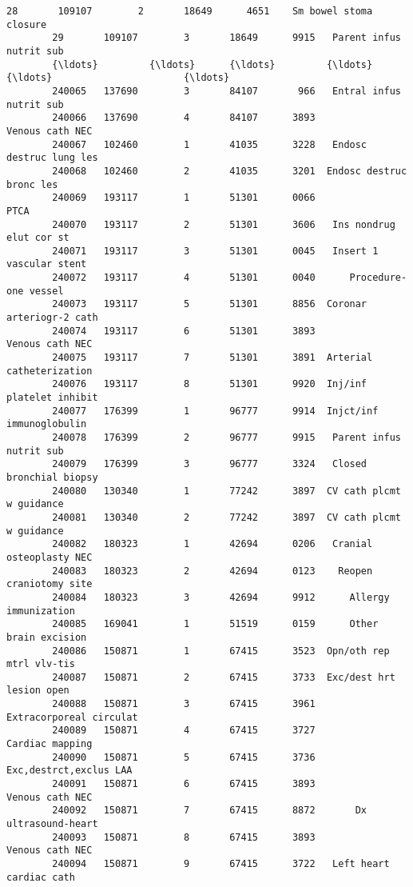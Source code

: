 \documentclass[11pt]{article}
\begin{document}
\begin{Verbatim}[commandchars=\\\{\}]
        28       109107        2       18649      4651    Sm bowel stoma closure   
        29       109107        3       18649      9915   Parent infus nutrit sub   
        {\ldots}         {\ldots}      {\ldots}         {\ldots}       {\ldots}                       {\ldots}   
        240065   137690        3       84107       966   Entral infus nutrit sub   
        240066   137690        4       84107      3893           Venous cath NEC   
        240067   102460        1       41035      3228   Endosc destruc lung les   
        240068   102460        2       41035      3201  Endosc destruc bronc les   
        240069   193117        1       51301      0066                      PTCA   
        240070   193117        2       51301      3606   Ins nondrug elut cor st   
        240071   193117        3       51301      0045   Insert 1 vascular stent   
        240072   193117        4       51301      0040      Procedure-one vessel   
        240073   193117        5       51301      8856  Coronar arteriogr-2 cath   
        240074   193117        6       51301      3893           Venous cath NEC   
        240075   193117        7       51301      3891  Arterial catheterization   
        240076   193117        8       51301      9920  Inj/inf platelet inhibit   
        240077   176399        1       96777      9914  Injct/inf immunoglobulin   
        240078   176399        2       96777      9915   Parent infus nutrit sub   
        240079   176399        3       96777      3324   Closed bronchial biopsy   
        240080   130340        1       77242      3897  CV cath plcmt w guidance   
        240081   130340        2       77242      3897  CV cath plcmt w guidance   
        240082   180323        1       42694      0206   Cranial osteoplasty NEC   
        240083   180323        2       42694      0123    Reopen craniotomy site   
        240084   180323        3       42694      9912      Allergy immunization   
        240085   169041        1       51519      0159      Other brain excision   
        240086   150871        1       67415      3523  Opn/oth rep mtrl vlv-tis   
        240087   150871        2       67415      3733  Exc/dest hrt lesion open   
        240088   150871        3       67415      3961   Extracorporeal circulat   
        240089   150871        4       67415      3727           Cardiac mapping   
        240090   150871        5       67415      3736    Exc,destrct,exclus LAA   
        240091   150871        6       67415      3893           Venous cath NEC   
        240092   150871        7       67415      8872       Dx ultrasound-heart   
        240093   150871        8       67415      3893           Venous cath NEC   
        240094   150871        9       67415      3722   Left heart cardiac cath   
        

\end{Verbatim}
\end{document}
